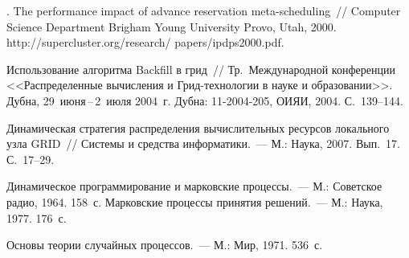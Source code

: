 \begin{multicols}{2}
{{\begin{thebibliography}{9}
.
The per\-formance impact of advance reservation meta-scheduling~// Computer Science Department
Brigham Young University Provo, Utah, 2000. {\sf
http://supercluster.org/research/ papers/ipdps2000.pdf}.

Использование алгоритма Backfill в грид~// Тр.\ Международной конференции
<<Распределенные вычисления и Грид-тех\-но\-ло\-гии в науке и образовании>>. Дубна,
29~июня\,--\,2~июля 2004~г. Дубна: 11-2004-205, ОИЯИ, 2004. С.~139--144.

Динамическая стратегия распределения вычислительных ресурсов локального узла GRID~//
Системы и средства информатики.~--- М.: Наука, 2007. Вып.~17. С.~17--29.

Динамическое программирование и марковские процессы.~--- М.: Советское радио, 1964.
158~с.
Марковские процессы принятия решений.~--- М.: Наука, 1977. 176~с.

\label{end\stat}

Основы теории случайных процессов.~--- М.: Мир, 1971. 536~с.

\end{thebibliography}

}
}
\end{multicols}